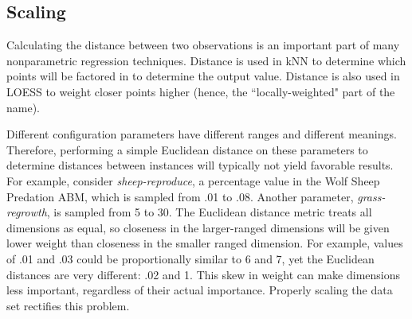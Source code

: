 

\subsection{Scaling}

Calculating the distance between two observations is an important part of many nonparametric regression techniques.
Distance is used in kNN to determine which points will  be factored in to determine the output value.
Distance is also used in LOESS to weight closer points higher (hence, the ``locally-weighted" part of the name).

Different configuration parameters have different ranges and different meanings.
Therefore, performing a simple Euclidean distance on these parameters to determine distances between instances will typically not yield favorable results.
For example, consider \textit{sheep-reproduce}, a percentage value in the Wolf Sheep Predation ABM, which is sampled from .01 to .08.
Another parameter, \textit{grass-regrowth}, is sampled from 5 to 30.
The Euclidean distance metric treats all dimensions as equal, so closeness in the larger-ranged dimensions will be given lower weight than closeness in the smaller ranged dimension.
For example, values of .01 and .03 could be proportionally similar to 6 and 7, yet the Euclidean distances are very different: .02 and 1.
This skew in weight can make dimensions less important, regardless of their actual importance.
Properly scaling the data set rectifies this problem.


